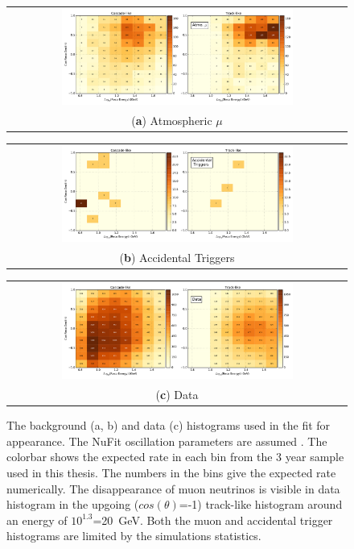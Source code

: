 \begin{figure}[h]
\centeri
\begin{tabular}[b]{c}
  \includegraphics[width=0.7\textwidth]{templates/muongundima.pdf}  \\
  \small (\textbf{\color{ctcolormain}a}) Atmospheric $\mu$
\end{tabular}
\linebreak
\begin{tabular}[b]{c}
  \includegraphics[width=0.7\textwidth]{templates/vuvuzela.pdf}  \\
  \small (\textbf{\color{ctcolormain}b})  Accidental Triggers
\end{tabular}
\linebreak
\begin{tabular}[b]{c}
  \includegraphics[width=0.7\textwidth]{templates/data2012-4.pdf}  \\
  \small (\textbf{\color{ctcolormain}c})  Data
\end{tabular}
\caption[Background and data histograms for appearance analysis]{The background (a, b) and data (c) histograms used in the fit for appearance. The NuFit oscillation parameters are assumed \cite{NuFit.org}. The colorbar shows the expected rate in each bin from the 3 year sample used in this thesis. The numbers in the bins give the expected rate numerically. The disappearance of muon neutrinos is visible in data histogram in the upgoing ($cos(\theta)$=-1) track-like histogram around an energy of $10^{1.3}$=20~GeV. Both the muon and accidental trigger histograms are limited by the simulations statistics. }
\label{fig:bg_data_templates}
\end{figure}

